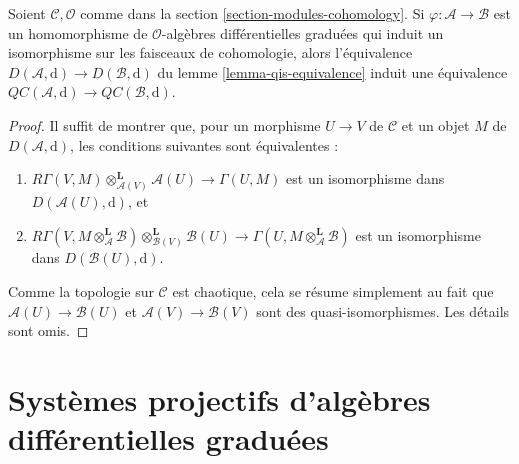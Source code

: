 \begin{lemma}
\label{lemma-cartesian-qis-equivalence}
Soient $\mathcal{C}, \mathcal{O}$ comme dans
la section \ref{section-modules-cohomology}. Si
$\varphi : \mathcal{A} \to \mathcal{B}$ est un homomorphisme de
$\mathcal{O}$-algèbres différentielles graduées qui induit un
isomorphisme sur les faisceaux de cohomologie, alors
l'équivalence $D(\mathcal{A}, \text{d}) \to D(\mathcal{B}, \text{d})$
du lemme \ref{lemma-qis-equivalence} induit une équivalence
$\mathit{QC}(\mathcal{A}, \text{d}) \to
\mathit{QC}(\mathcal{B}, \text{d})$.
\end{lemma}

\begin{proof}
Il suffit de montrer que, pour un morphisme $U \to V$ de $\mathcal{C}$ et un objet
$M$ de $D(\mathcal{A}, \text{d})$, les conditions suivantes sont équivalentes :
\begin{enumerate}
\item $R\Gamma(V, M) \otimes_{\mathcal{A}(V)}^\mathbf{L} \mathcal{A}(U)
\to \Gamma(U, M)$ est un isomorphisme dans $D(\mathcal{A}(U), \text{d})$,
et \item $R\Gamma(V, M \otimes_\mathcal{A}^\mathbf{L} \mathcal{B})
\otimes_{\mathcal{B}(V)}^\mathbf{L} \mathcal{B}(U)
\to \Gamma(U, M \otimes_\mathcal{A}^\mathbf{L} \mathcal{B})$ est un
isomorphisme dans $D(\mathcal{B}(U), \text{d})$.
\end{enumerate} Comme
la topologie sur $\mathcal{C}$ est chaotique, cela se résume simplement au
fait que $\mathcal{A}(U) \to \mathcal{B}(U)$ et
$\mathcal{A}(V) \to \mathcal{B}(V)$ sont des quasi-isomorphismes. Les
détails sont omis.
\end{proof}






\section{Systèmes projectifs d'algèbres différentielles graduées}
\label{section-qc-inverse-system}

